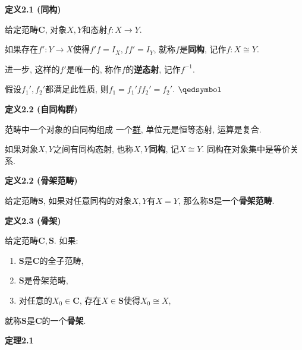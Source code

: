 \documentclass[UTF8]{ctexart}
\begin{document}
\hypertarget{sec:定义2.1}{}
\noindent\textbf{定义2.1 (同构)}

给定范畴$\mathbf{C}$, 对象$X,Y$和态射$f:X\to Y$.

如果存在$f':Y\to X$使得$f'f=I_X,ff'=I_Y$, 就称$f$是\textbf{同构},
记作$f:X\cong Y$.

\vspace{10pt}

进一步, 这样的$f'$是唯一的, 称作$f$的\textbf{逆态射}, 记作$f^{-1}$.


假设$f_1',f_2'$都满足此性质, 则$f_1=f_1'ff_2'=f_2'$. \hfill $\qedsymbol$

\vspace{10pt}

\hypertarget{sec:定义2.2}{}
\noindent\textbf{定义2.2 (自同构群)}

范畴中一个对象的自同构组成
一个\href{../../05 抽象代数/01 群论/01 群、子群与商群/01 半群与群#nameddest=sec:定义2.1}{群},
单位元是恒等态射, 运算是复合.

\vspace{10pt}

如果对象$X,Y$之间有同构态射, 也称$X,Y$\textbf{同构}, 记$X\cong Y$.
同构在对象集中是等价关系.

\vspace{10pt}

\hypertarget{sec:定义2.2}{}
\noindent\textbf{定义2.2 (骨架范畴)}

给定范畴$\mathbf{S}$, 如果对任意同构的对象$X,Y$有$X=Y$,
那么称$\mathbf{S}$是一个\textbf{骨架范畴}.

\vspace{10pt}

\hypertarget{sec:定义2.3}{}
\noindent\textbf{定义2.3 (骨架)}

给定范畴$\mathbf{C},\mathbf{S}$. 如果:
\begin{enumerate}
    \item $\mathbf{S}$是$\mathbf{C}$的全子范畴,
    \item $\mathbf{S}$是骨架范畴,
    \item 对任意的$X_0\in\mathbf{C}$, 存在$X\in\mathbf{S}$使得$X_0\cong X$,
\end{enumerate}
就称$\mathbf{S}$是$\mathbf{C}$的一个\textbf{骨架}.


\vspace{10pt}

\hypertarget{sec:定理2.1}{}
\noindent\textbf{定理2.1}
\end{document}
